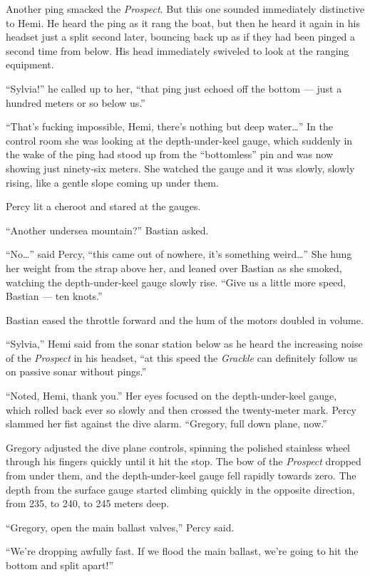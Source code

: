 \documentclass[
]{scrbook}
\begin{document}
Another ping smacked the \emph{Prospect}. But this one sounded
immediately distinctive to Hemi. He heard the ping as it rang the boat,
but then he heard it again in his headset just a split second later,
bouncing back up as if they had been pinged a second time from below.
His head immediately swiveled to look at the ranging equipment.

``Sylvia!'' he called up to her, ``that ping just echoed off the bottom
--- just a hundred meters or so below us.''

``That's fucking impossible, Hemi, there's nothing but deep
water\ldots{}'' In the control room she was looking at the
depth-under-keel gauge, which suddenly in the wake of the ping had stood
up from the ``bottomless'' pin and was now showing just ninety-six
meters. She watched the gauge and it was slowly, slowly rising, like a
gentle slope coming up under them.

Percy lit a cheroot and stared at the gauges.

``Another undersea mountain?'' Bastian asked.

``No\ldots{}'' said Percy, ``this came out of nowhere, it's something
weird\ldots{}'' She hung her weight from the strap above her, and leaned
over Bastian as she smoked, watching the depth-under-keel gauge slowly
rise. ``Give us a little more speed, Bastian --- ten knots.''

Bastian eased the throttle forward and the hum of the motors doubled in
volume.

``Sylvia,'' Hemi said from the sonar station below as he heard the
increasing noise of the \emph{Prospect} in his headset, ``at this speed
the \emph{Grackle} can definitely follow us on passive sonar without
pings.''

``Noted, Hemi, thank you.'' Her eyes focused on the depth-under-keel
gauge, which rolled back ever so slowly and then crossed the
twenty-meter mark. Percy slammed her fist against the dive alarm.
``Gregory, full down plane, now.''

Gregory adjusted the dive plane controls, spinning the polished
stainless wheel through his fingers quickly until it hit the stop. The
bow of the \emph{Prospect} dropped from under them, and the
depth-under-keel gauge fell rapidly towards zero. The depth from the
surface gauge started climbing quickly in the opposite direction, from
235, to 240, to 245 meters deep.

``Gregory, open the main ballast valves,'' Percy said.

``We're dropping awfully fast. If we flood the main ballast, we're going
to hit the bottom and split apart!''
\end{document}
